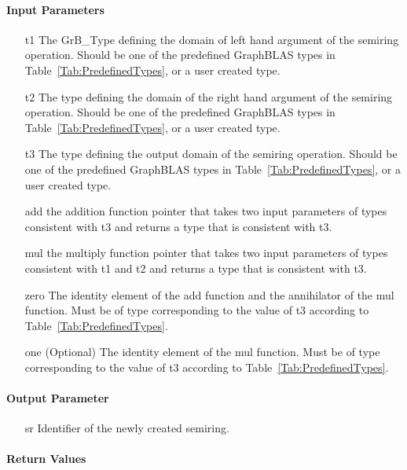 \paragraph{Input Parameters}

\begin{itemize}[leftmargin=1.1in]
    \item[{\sf t1}] The GrB\_Type defining the domain of left hand argument of
    the semiring operation. Should be one of the predefined
    GraphBLAS types in Table~\ref{Tab:PredefinedTypes}, or a user created type.
    \item[{\sf t2}] The type defining the domain of the right hand argument of
    the semiring operation. Should be one of the predefined
    GraphBLAS types in Table~\ref{Tab:PredefinedTypes}, or a user created type.
    \item[{\sf t3}] The type defining the output domain of the semiring
    operation. Should be one of the predefined
    GraphBLAS types in Table~\ref{Tab:PredefinedTypes}, or a user created type.
    \item[{\sf add}] the addition function pointer that takes two input parameters
    of types consistent with t3 and returns a type that is consistent with t3.
    \item[{\sf mul}] the multiply function pointer that takes two input parameters
    of types consistent with t1 and t2 and returns a type that is consistent with t3.
    \item[{\sf zero}] The identity element of the {\sf add} function and the annihilator
    of the {\sf mul} function. 
    Must be of type corresponding to the value of {\sf t3} according to Table~\ref{Tab:PredefinedTypes}.
    \item[{\sf one}] (Optional) The identity element of the {\sf mul} function. 
    Must be of type corresponding to the value of {\sf t3} according to Table~\ref{Tab:PredefinedTypes}.
\end{itemize}

\paragraph{Output Parameter}

\begin{itemize}[leftmargin=1.1in]
    \item[{\sf sr}] Identifier of the newly created semiring.
\end{itemize}


\paragraph{Return Values}

